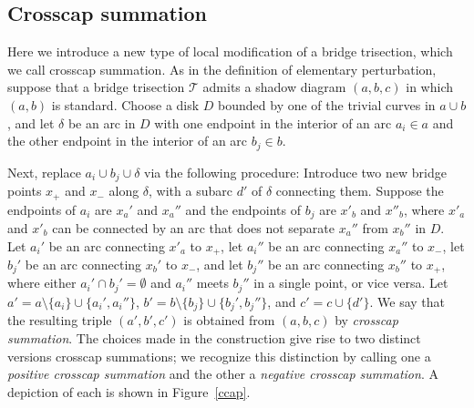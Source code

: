 \documentclass[11pt, oneside]{amsart}
\theoremstyle{theorem}
\theoremstyle{definition}
\newcommand{\emp}{\emptyset}
\newcommand{\T}{\mathcal{T}}
\theoremstyle{theorem}
\begin{document}

\subsection{Crosscap summation}

Here we introduce a new type of local modification of a bridge trisection, which we call crosscap summation.  As in the definition of elementary perturbation, suppose that a bridge trisection $\T$ admits a shadow diagram $(a,b,c)$ in which $(a,b)$ is standard.  Choose a disk $D$ bounded by one of the trivial curves in $a\cup b$, and let $\delta$ be an arc in $D$ with one endpoint in the interior of an arc $a_i \in a$ and the other endpoint in the interior of an arc $b_j \in b$.

Next, replace $a_i \cup b_j \cup \delta$ via the following procedure:  Introduce two new bridge points $x_+$ and $x_-$ along $\delta$, with a subarc $d'$ of $\delta$ connecting them.  Suppose the endpoints of $a_i$ are $x_a'$ and $x_a''$ and the endpoints of $b_j$ are $x'_b$ and $x''_b$, where $x'_a$ and $x'_b$ can be connected by an arc that does not separate $x_a''$ from $x_b''$ in $D$.  Let $a_i'$ be an arc connecting $x'_a$ to $x_+$, let $a_i''$ be an arc connecting $x_a''$ to $x_-$, let $b_j'$ be an arc connecting $x_b'$ to $x_-$, and let $b_j''$ be an arc connecting $x_b''$ to $x_+$, where either $a_i' \cap b_j' = \emp$ and $a_i''$ meets $b_j''$ in a single point, or vice versa.  Let $a' = a \setminus \{a_i\} \cup \{a_i',a_i''\}$, $b' = b \setminus \{b_j\} \cup \{b_j',b_j''\}$, and $c' = c \cup \{d'\}$.  We say that the resulting triple $(a',b',c')$ is obtained from $(a,b,c)$ by \emph{crosscap summation}.  The choices made in the construction give rise to two distinct versions crosscap summations; we recognize this distinction by calling one a \emph{positive crosscap summation} and the other a \emph{negative crosscap summation}.  A depiction of each is shown in Figure~\ref{ccap}.
\end{document}
